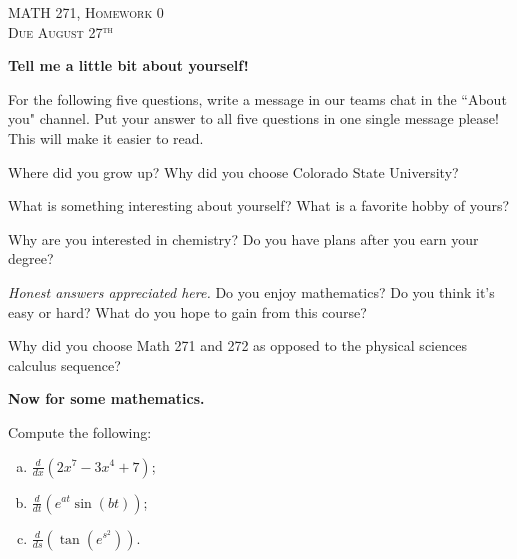 \documentclass[12pt]{article} %
\begin{document}
\begin{center}
   \textsc{\large MATH 271, Homework 0}\\
   \textsc{Due August 27$^\textrm{th}$}
\end{center}

\begin{center}
    \textbf{Tell me a little bit about yourself!}
\end{center}

\noindent For the following five questions, write a message in our teams chat in the ``About you" channel.  Put your answer to all five questions in one single message please! This will make it easier to read.

\begin{question}
    Where did you grow up? Why did you choose Colorado State University?
\end{question}

\begin{question}
    What is something interesting about yourself?  What is a favorite hobby of yours?
\end{question}

\begin{question}
    Why are you interested in chemistry? Do you have plans after you earn your degree?
\end{question}

\begin{question}
    \emph{Honest answers appreciated here.}  Do you enjoy mathematics? Do you think it's easy or hard? What do you hope to gain from this course?
\end{question}

\begin{question}
    Why did you choose Math 271 and 272 as opposed to the physical sciences calculus sequence?
\end{question}


\begin{center}
    \textbf{Now for some mathematics.}
\end{center}

\begin{problem}
    Compute the following:
\begin{enumerate}[(a)]
    \item $\displaystyle{\frac{d}{dx}(2x^7-3x^4+7)}$;
    \item $\displaystyle{\frac{d}{dt}\left(e^{at}\sin(bt)\right)}$;
    \item $\displaystyle{\frac{d}{ds}\left(\tan\left( e^{s^2}\right)\right)}$.
\end{enumerate}
\end{problem}
\end{document}
